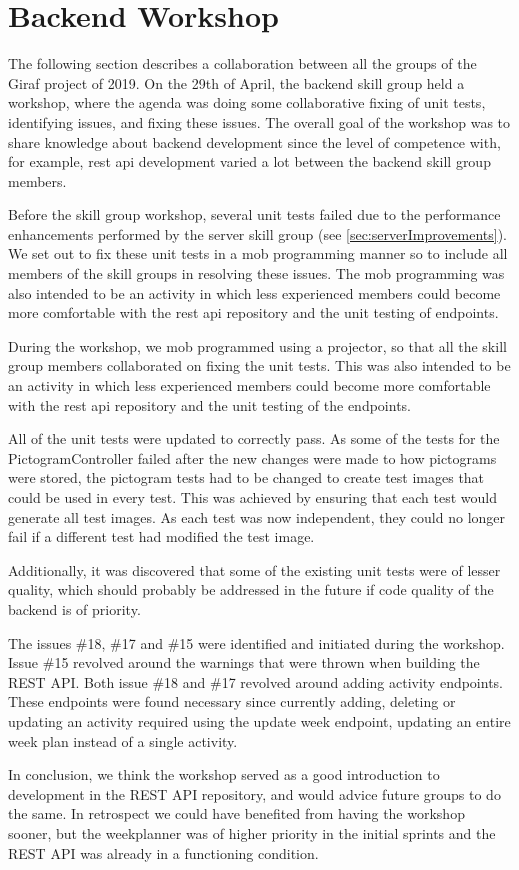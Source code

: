 \section{Backend Workshop}
The following section describes a collaboration between all the groups of the Giraf project of 2019. On the 29th of April, the backend skill group held a workshop, where the agenda was doing some collaborative fixing of unit tests, identifying issues, and fixing these issues. The overall goal of the workshop was to share knowledge about backend development since the level of competence with, for example, \gls{rest} \gls{api} development varied a lot between the backend skill group members.

Before the skill group workshop, several unit tests failed due to the performance enhancements performed by the server skill group (see \autoref{sec:serverImprovements}). We set out to fix these unit tests in a mob programming manner so to include all members of the skill groups in resolving these issues. The mob programming was also intended to be an activity in which less experienced members could become more comfortable with the \gls{rest} \gls{api} repository and the unit testing of endpoints.

During the workshop, we mob programmed using a projector, so that all the skill group members collaborated on fixing the unit tests. This was also intended to be an activity in which less experienced members could become more comfortable with the \gls{rest} \gls{api} repository and the unit testing of the endpoints.

All of the unit tests were updated to correctly pass. As some of the tests for the PictogramController failed after the new changes were made to how pictograms were stored, the pictogram tests had to be changed to create test images that could be used in every test. This was achieved by ensuring that each test would generate all test images. As each test was now independent, they could no longer fail if a different test had modified the test image.

Additionally, it was discovered that some of the existing unit tests were of lesser quality, which should probably be addressed in the future if code quality of the backend is of priority.

The issues \#18, \#17 and \#15 were identified and initiated during the workshop. Issue \#15 revolved around the warnings that were thrown when building the REST API. Both issue \#18 and \#17 revolved around adding activity endpoints. These endpoints were found necessary since currently adding, deleting or updating an activity required using the update week endpoint, updating an entire week plan instead of a single activity.

In conclusion, we think the workshop served as a good introduction to development in the REST API repository, and would advice future groups to do the same. In retrospect we could have benefited from having the workshop sooner, but the weekplanner was of higher priority in the initial sprints and the REST API was already in a functioning condition.